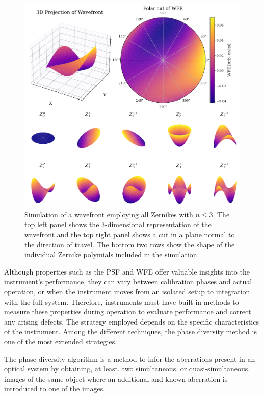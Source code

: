 \begin{figure}
  \centering
  \includegraphics[width = \textwidth]{figures/Introduction/zernikes_combined.pdf}
  \caption[Zernike representation of wavefront error.]{Simulation of a wavefront employing all Zernikes with $n \leqslant 3$. The top left panel shows the 3-dimensional representation of the wavefront and the top right panel shows a cut in a plane normal to the direction of travel. The bottom two rows show the shape of the individual Zernike polymials included in the simulation.} 
  \label{fig_intro: zernikes}
\end{figure}

Although properties such as the PSF and WFE offer valuable insights into the instrument's performance, they can vary between calibration phases and actual operation, or when the instrument moves from an isolated setup to integration with the full system. Therefore, instruments must have built-in methods to measure these properties during operation to evaluate performance and correct any arising defects. The strategy employed depends on the specific characteristics of the instrument. Among the different techniques, the phase diversity method is one of the most extended strategies. 

The phase diversity algorithm \citep{PD_original} is a method to infer the aberrations present in an optical system by obtaining, at least, two simultaneous, or quasi-simultaneous, images of the same object where an additional and known aberration is introduced to one of the images.  

